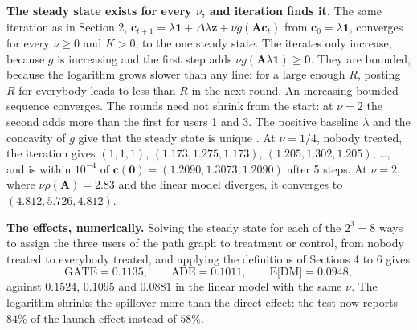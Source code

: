 \documentclass[11pt]{article}
\newcommand{\one}{\mathbf{1}}
\newcommand{\vzero}{\mathbf{0}}
\newcommand{\vc}{\boldsymbol{c}}
\newcommand{\vz}{\boldsymbol{z}}
\newcommand{\mA}{\mathbf{A}}
\begin{document}
\textbf{The steady state exists for every $\nu$, and iteration finds it.}  The same iteration as in Section 2, $\vc_{t+1} = \lambda\one + \Delta\lambda\vz + \nu g(\mA\vc_t)$ from $\vc_0 = \lambda\one$, converges for every $\nu \ge 0$ and $K > 0$, to the one steady state.  The iterates only increase, because $g$ is increasing and the first step adds $\nu g(\mA\lambda\one) \ge \vzero$.  They are bounded, because the logarithm grows slower than any line: for a large enough $R$, posting $R$ for everybody leads to less than $R$ in the next round.  An increasing bounded sequence converges.  The rounds need not shrink from the start: at $\nu = 2$ the second adds more than the first for users 1 and 3.  The positive baseline $\lambda$ and the concavity of $g$ give that the steady state is unique \cite{kennan2001,belhaj2014}.  At $\nu = 1/4$, nobody treated, the iteration gives $(1, 1, 1)$, $(1.173, 1.275, 1.173)$, $(1.205, 1.302, 1.205)$, \dots, and is within $10^{-4}$ of $\vc(\vzero) = (1.2090, 1.3073, 1.2090)$ after 5 steps.  At $\nu = 2$, where $\nu\rho(\mA) = 2.83$ and the linear model diverges, it converges to $(4.812, 5.726, 4.812)$.

\textbf{The effects, numerically.}  Solving the steady state for each of the $2^3 = 8$ ways to assign the three users of the path graph to treatment or control, from nobody treated to everybody treated, and applying the definitions of Sections 4 to 6 gives
\[
\text{GATE} = 0.1135, \qquad \text{ADE} = 0.1011, \qquad \text{E[DM]} = 0.0948,
\]
against $0.1524$, $0.1095$ and $0.0881$ in the linear model with the same $\nu$.  The logarithm shrinks the spillover more than the direct effect: the test now reports $84\%$ of the launch effect instead of $58\%$.
\end{document}
